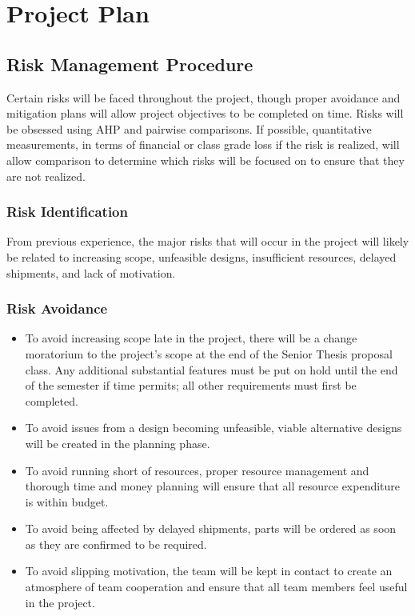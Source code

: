 \chapter{Project Plan}
\section{Risk Management Procedure}
Certain risks will be faced throughout the project, though proper avoidance and mitigation plans will allow project objectives to be completed on time.
Risks will be obsessed using AHP and pairwise comparisons.
If possible, quantitative measurements, in terms of financial or class grade loss if the risk is realized, will allow comparison to determine which risks will be focused on to ensure that they are not realized.

\subsection{Risk Identification}
From previous experience, the major risks that will occur in the project will likely be related to increasing scope, unfeasible designs, insufficient resources, delayed shipments, and lack of motivation.

\subsection{Risk Avoidance}
\begin{itemize} \parskip2pt
	\item To avoid increasing scope late in the project, there will be a change moratorium to the project’s scope at the end of the Senior Thesis proposal class.
Any additional substantial features must be put on hold until the end of the semester if time permits; all other requirements must first be completed.
	\item To avoid issues from a design becoming unfeasible, viable alternative designs will be created in the planning phase.
	\item To avoid running short of resources, proper resource management and thorough time and money planning will ensure that all resource expenditure is within budget.
	\item To avoid being affected by delayed shipments, parts will be ordered as soon as they are confirmed to be required.
	\item To avoid slipping motivation, the team will be kept in contact to create an atmosphere of team cooperation and ensure that all team members feel useful in the project.
\end{itemize}	

